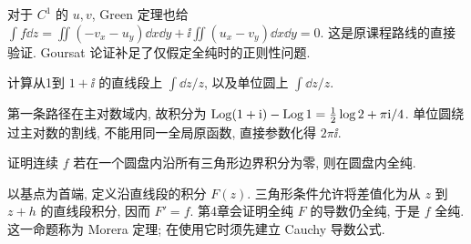 \begin{center}
\end{center}
\begin{remark}
对于 $C^1$ 的 $u,v$, Green 定理也给 $\int f\dd z=\iint(-v_x-u_y)\dd x\dd y+\ii\iint(u_x-v_y)\dd x\dd y=0$. 这是原课程路线的直接验证. Goursat 论证补足了仅假定全纯时的正则性问题.
\end{remark}

\begin{exercise}
计算从1到 $1+\ii$ 的直线段上 $\int\dd z/z$, 以及单位圆上 $\int\dd z/z$.
\end{exercise}
\begin{solution}
第一条路径在主对数域内, 故积分为 $\operatorname{Log}(1+\mathrm i)-\operatorname{Log}1=\tfrac12\log2+\pi\mathrm i/4$. 单位圆绕过主对数的割线, 不能用同一全局原函数, 直接参数化得 $2\pi\ii$.
\end{solution}
\begin{exercise}
证明连续 $f$ 若在一个圆盘内沿所有三角形边界积分为零, 则在圆盘内全纯.
\end{exercise}
\begin{solution}
以基点为首端, 定义沿直线段的积分 $F(z)$. 三角形条件允许将差值化为从 $z$ 到 $z+h$ 的直线段积分, 因而 $F'=f$. 第4章会证明全纯 $F$ 的导数仍全纯, 于是 $f$ 全纯. 这一命题称为 Morera 定理; 在使用它时须先建立 Cauchy 导数公式.
\end{solution}
